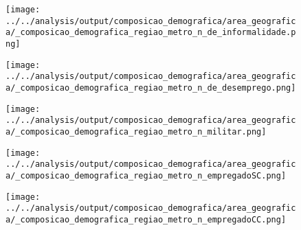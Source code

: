 \begin{frame}[label=_composicao_demografica_regiao_metro_n_de_informalidade]{}
\textit{\hyperlink{_composicao_demografica_regiao_metro}{}}
\begin{figure}
  \centering
  \texttt{[image: ../../analysis/output/composicao\_demografica/area\_geografica/\_composicao\_demografica\_regiao\_metro\_n\_de\_informalidade.png]}
  \caption{}
  \label{fig:_composicao_demografica_regiao_metro_n_de_informalidade}
\end{figure}
\end{frame}

\begin{frame}[label=_composicao_demografica_regiao_metro_n_de_desemprego]{}
\textit{\hyperlink{_composicao_demografica_regiao_metro}{}}
\begin{figure}
  \centering
  \texttt{[image: ../../analysis/output/composicao\_demografica/area\_geografica/\_composicao\_demografica\_regiao\_metro\_n\_de\_desemprego.png]}
  \caption{}
  \label{fig:_composicao_demografica_regiao_metro_n_de_desemprego}
\end{figure}
\end{frame}

\begin{frame}[label=_composicao_demografica_regiao_metro_n_militar]{}
\textit{\hyperlink{_composicao_demografica_regiao_metro}{}}
\begin{figure}
  \centering
  \texttt{[image: ../../analysis/output/composicao\_demografica/area\_geografica/\_composicao\_demografica\_regiao\_metro\_n\_militar.png]}
  \caption{}
  \label{fig:_composicao_demografica_regiao_metro_n_militar}
\end{figure}
\end{frame}


\begin{frame}[label=_composicao_demografica_regiao_metro_n_empregadoSC]{}
\textit{\hyperlink{_composicao_demografica_regiao_metro}{}}
\begin{figure}
  \centering
  \texttt{[image: ../../analysis/output/composicao\_demografica/area\_geografica/\_composicao\_demografica\_regiao\_metro\_n\_empregadoSC.png]}
  \caption{}
  \label{fig:_composicao_demografica_regiao_metro_n_empregadoSC}
\end{figure}
\end{frame}

\begin{frame}[label=_composicao_demografica_regiao_metro_n_empregadoCC]{}
\textit{\hyperlink{_composicao_demografica_regiao_metro}{}}
\begin{figure}
  \centering
  \texttt{[image: ../../analysis/output/composicao\_demografica/area\_geografica/\_composicao\_demografica\_regiao\_metro\_n\_empregadoCC.png]}
  \caption{}
  \label{fig:_composicao_demografica_regiao_metro_n_empregadoCC}
\end{figure}
\end{frame}

